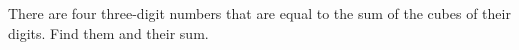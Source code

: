 There are four three-digit numbers that are equal to the sum of the cubes of their digits. Find them and their sum.
